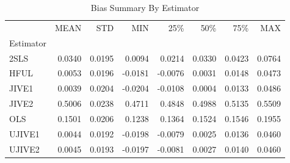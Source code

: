 \begin{table}[ht]
\centering
\caption{Bias Summary By Estimator}
\begin{tabular}{lrrrrrrr}
\toprule
 & MEAN & STD & MIN & 25\% & 50\% & 75\% & MAX \\
Estimator &  &  &  &  &  &  &  \\
\midrule
2SLS & 0.0340 & 0.0195 & 0.0094 & 0.0214 & 0.0330 & 0.0423 & 0.0764 \\
HFUL & 0.0053 & 0.0196 & -0.0181 & -0.0076 & 0.0031 & 0.0148 & 0.0473 \\
JIVE1 & 0.0039 & 0.0204 & -0.0204 & -0.0108 & 0.0004 & 0.0133 & 0.0486 \\
JIVE2 & 0.5006 & 0.0238 & 0.4711 & 0.4848 & 0.4988 & 0.5135 & 0.5509 \\
OLS & 0.1501 & 0.0206 & 0.1238 & 0.1364 & 0.1524 & 0.1546 & 0.1955 \\
UJIVE1 & 0.0044 & 0.0192 & -0.0198 & -0.0079 & 0.0025 & 0.0136 & 0.0460 \\
UJIVE2 & 0.0045 & 0.0193 & -0.0197 & -0.0081 & 0.0027 & 0.0140 & 0.0460 \\
\bottomrule
\end{tabular}
\end{table}
